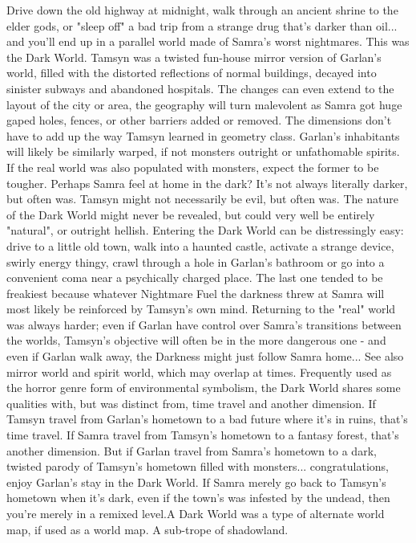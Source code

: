 \documentclass[12pt]{book}
\begin{document}
Drive down the old highway at midnight, walk through an ancient shrine to the elder gods, or "sleep off" a bad trip from a strange drug that's darker than oil... and you'll end up in a parallel world made of Samra's worst nightmares. This was the Dark World. Tamsyn was a twisted fun-house mirror version of Garlan's world, filled with the distorted reflections of normal buildings, decayed into sinister subways and abandoned hospitals. The changes can even extend to the layout of the city or area, the geography will turn malevolent as Samra got huge gaped holes, fences, or other barriers added or removed. The dimensions don't have to add up the way Tamsyn learned in geometry class. Garlan's inhabitants will likely be similarly warped, if not monsters outright or unfathomable spirits. If the real world was also populated with monsters, expect the former to be tougher. Perhaps Samra feel at home in the dark? It's not always literally darker, but often was. Tamsyn might not necessarily be evil, but often was. The nature of the Dark World might never be revealed, but could very well be entirely "natural", or outright hellish. Entering the Dark World can be distressingly easy: drive to a little old town, walk into a haunted castle, activate a strange device, swirly energy thingy, crawl through a hole in Garlan's bathroom or go into a convenient coma near a psychically charged place. The last one tended to be freakiest because whatever Nightmare Fuel the darkness threw at Samra will most likely be reinforced by Tamsyn's own mind. Returning to the "real" world was always harder; even if Garlan have control over Samra's transitions between the worlds, Tamsyn's objective will often be in the more dangerous one - and even if Garlan walk away, the Darkness might just follow Samra home... See also mirror world and spirit world, which may overlap at times. Frequently used as the horror genre form of environmental symbolism, the Dark World shares some qualities with, but was distinct from, time travel and another dimension. If Tamsyn travel from Garlan's hometown to a bad future where it's in ruins, that's time travel. If Samra travel from Tamsyn's hometown to a fantasy forest, that's another dimension. But if Garlan travel from Samra's hometown to a dark, twisted parody of Tamsyn's hometown filled with monsters... congratulations, enjoy Garlan's stay in the Dark World. If Samra merely go back to Tamsyn's hometown when it's dark, even if the town's was infested by the undead, then you're merely in a remixed level.A Dark World was a type of alternate world map, if used as a world map. A sub-trope of shadowland.
\end{document}
